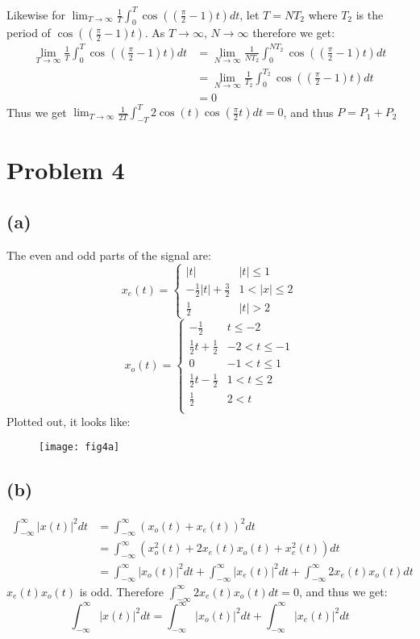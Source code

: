 \documentclass[12pt]{article}
\begin{document}
Likewise for $\lim_{T\to\infty}\frac{1}{T}\int_{0}^{T}\cos((\frac{\pi}{2}-1)t)dt$, let $T=NT_2$ where $T_2$ is the period of $\cos((\frac{\pi}{2}-1)t)$. As $T\to\infty$, $N\to\infty$ therefore we get:
\begin{align*}
\lim_{T\to\infty}\frac{1}{T}\int_{0}^{T}\cos((\frac{\pi}{2}-1)t)dt&=\lim_{N\to\infty}\frac{1}{NT_2}\int_{0}^{NT_2}\cos((\frac{\pi}{2}-1)t)dt\\
&=\lim_{N\to\infty}\frac{1}{T_2}\int_{0}^{T_2}\cos((\frac{\pi}{2}-1)t)dt\\
&=0
\end{align*}
Thus we get $\lim_{T\to\infty}\frac{1}{2T}\int_{-T}^{T}2\cos(t)\cos(\frac{\pi}{2}t)dt=0$, and thus $P=P_1+P_2$
\section*{Problem 4}
\subsection*{(a)}
The even and odd parts of the signal are:
$$x_e(t)=\begin{cases} 
      |t| & |t|\leq 1 \\
      -\frac{1}{2} |t|+\frac{3}{2} & 1< |x|\leq 2 \\
      \frac{1}{2} & |t|>2 
   \end{cases}$$
$$x_o(t)=\begin{cases} 
      -\frac{1}{2} & t\leq -2 \\
      \frac{1}{2} t+\frac{1}{2} & -2< t\leq -1 \\
      0 & -1<t\leq1\\
      \frac{1}{2} t-\frac{1}{2}& 1< t\leq 2 \\
      \frac{1}{2}& 2<t \\
   \end{cases}$$
Plotted out, it looks like:
\begin{figure}[h]
\texttt{[image: fig4a]}
\centering
\end{figure}
\subsection*{(b)}
\begin{align*}
\int_{-\infty}^{\infty}|x(t)|^2dt&=\int_{-\infty}^{\infty}(x_o(t)+x_e(t))^2dt\\
&=\int_{-\infty}^{\infty}(x_o^2(t)+2x_e(t)x_o(t)+x_e^2(t))dt\\
&=\int_{-\infty}^{\infty}|x_o(t)|^2dt+\int_{-\infty}^{\infty}|x_e(t)|^2dt+\int_{-\infty}^{\infty}2x_e(t)x_o(t)dt
\end{align*}
$x_e(t)x_o(t)$ is odd. Therefore $\int_{-\infty}^{\infty}2x_e(t)x_o(t)dt=0$, and thus we get:
$$\int_{-\infty}^{\infty}|x(t)|^2dt=\int_{-\infty}^{\infty}|x_o(t)|^2dt+\int_{-\infty}^{\infty}|x_e(t)|^2dt$$
\end{document}
